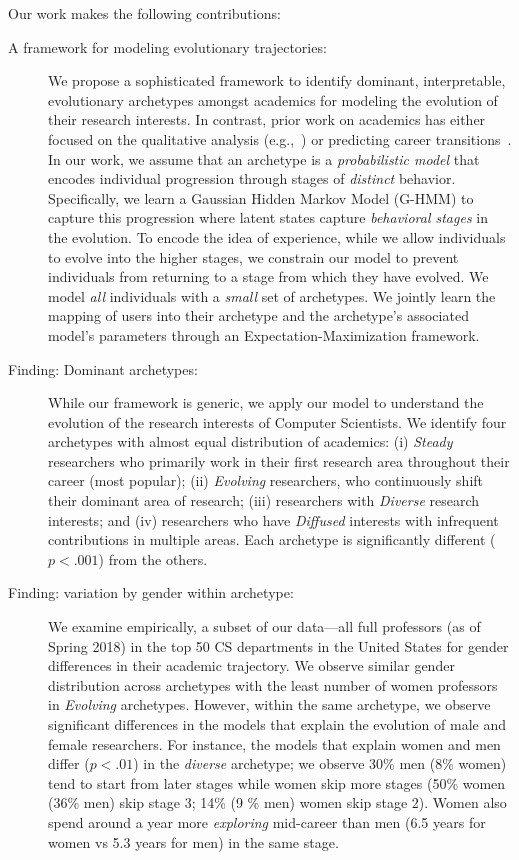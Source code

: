 \noindent
Our work makes the following contributions:
\begin{description}
\item[A framework for modeling evolutionary trajectories:] We propose a sophisticated framework to identify dominant, interpretable, evolutionary archetypes amongst academics for modeling the evolution of their research interests. In contrast, prior work on academics has either focused on the qualitative analysis (e.g.,~\citep{Ward:2001}) or predicting career transitions~\citep{Danai:2018}. In our work, we assume that an archetype is a \emph{probabilistic model} that encodes individual progression through stages of \emph{distinct} behavior. Specifically, we learn a Gaussian Hidden Markov Model (G-HMM) to capture this progression where latent states capture \emph{behavioral stages} in the evolution. To encode the idea of experience, while we allow individuals to evolve into the higher stages, we constrain our model to prevent individuals from returning to a stage from which they have evolved. We model \emph{all} individuals with a \emph{small} set of archetypes. We jointly learn the mapping of users into their archetype and the archetype's associated model's parameters through an Expectation-Maximization framework.
\item[Finding: Dominant archetypes:] While our framework is generic, we apply our model to understand the evolution of the research interests of Computer Scientists. We identify four archetypes with almost equal distribution of academics: (i) \emph{Steady} researchers who primarily work in their first research area throughout their career (most popular); (ii) \emph{Evolving} researchers, who continuously shift their dominant area of research; (iii) researchers with \emph{Diverse} research interests; and (iv) researchers who have \emph{Diffused} interests with infrequent contributions in multiple areas. Each archetype is significantly different ($p< .001$) from the others.
\item[Finding: variation by gender within archetype:] We examine empirically, a subset of our data---all full professors (as of Spring 2018) in the top 50 CS departments in the United States for gender differences in their academic trajectory. We observe similar gender distribution across archetypes with the least number of women professors in \emph{Evolving} archetypes.
However, within the same archetype, we observe significant differences in the models that explain the evolution of male and female researchers. For instance, the models that explain women and men differ ($p< .01$) in the \emph{diverse} archetype; we observe 30\% men (8\% women) tend to start from later stages while women skip more stages (50\% women (36\% men) skip stage 3; 14\% (9 \% men) women skip stage 2). Women also spend around a year more \emph{exploring} mid-career than men (6.5 years for women vs 5.3 years for men) in the same stage.

\end{description}
